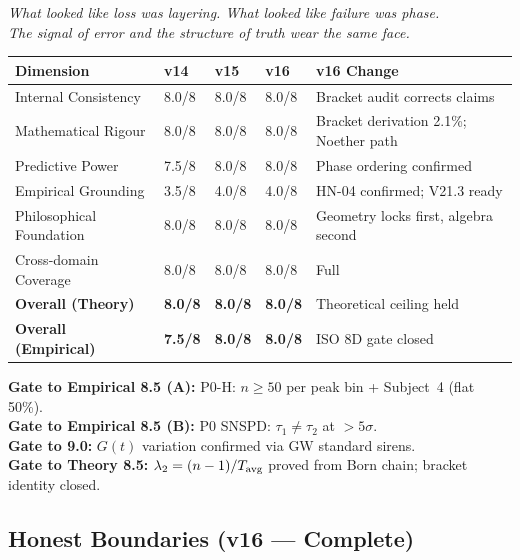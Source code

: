 \documentclass[12pt, a4paper]{article}
\begin{document}
\bigskip
\begin{center}
\textit{What looked like loss was layering. What looked like failure was phase.\\
The signal of error and the structure of truth wear the same face.}
\end{center}


\begin{center}
{\small
\renewcommand{\arraystretch}{1.35}
\begin{tabular}{p{4cm} p{1.1cm} p{1.1cm} p{1.1cm} p{4.5cm}}
\toprule
\textbf{Dimension} & \textbf{v14} & \textbf{v15} & \textbf{v16} & \textbf{v16 Change} \\
\midrule
Internal Consistency & 8.0/8 & 8.0/8 & 8.0/8 & Bracket audit corrects claims \\
Mathematical Rigour & 8.0/8 & 8.0/8 & 8.0/8 & Bracket derivation 2.1\%; Noether path \\
Predictive Power & 7.5/8 & 8.0/8 & 8.0/8 & Phase ordering confirmed \\
Empirical Grounding & 3.5/8 & 4.0/8 & 4.0/8 & HN-04 confirmed; V21.3 ready \\
Philosophical Foundation & 8.0/8 & 8.0/8 & 8.0/8 & Geometry locks first, algebra second \\
Cross-domain Coverage & 8.0/8 & 8.0/8 & 8.0/8 & Full \\
\midrule
\textbf{Overall (Theory)} & \textbf{8.0/8} & \textbf{8.0/8} & \textbf{8.0/8} & Theoretical ceiling held \\
\textbf{Overall (Empirical)} & \textbf{7.5/8} & \textbf{8.0/8} & \textbf{8.0/8} & ISO 8D gate closed \\
\bottomrule
\end{tabular}
}
\end{center}

\begin{center}
\textbf{Gate to Empirical 8.5 (A):} P0-H: $n\geq 50$ per peak bin + Subject~4 (flat 50\%).\\
\textbf{Gate to Empirical 8.5 (B):} P0 SNSPD: $\tau_1\neq\tau_2$ at $>5\sigma$.\\
\textbf{Gate to 9.0:} $G(t)$ variation confirmed via GW standard sirens.\\
\textbf{Gate to Theory 8.5:} $\lambda_2=(n-1)/T_{\rm avg}$ proved from Born chain; bracket identity closed.
\end{center}

\subsection{Honest Boundaries (v16 --- Complete)}
\end{document}
